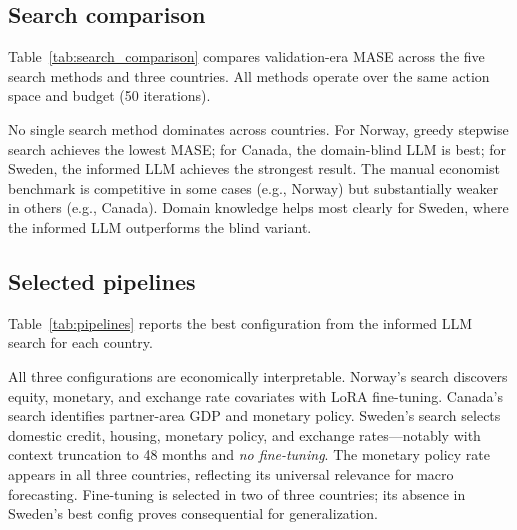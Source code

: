 \documentclass[12pt,a4paper]{article}
\begin{document}
\subsection{Search comparison}
\label{sec:results_search}

Table~\ref{tab:search_comparison} compares validation-era MASE across the five search methods and three countries. All methods operate over the same action space and budget (50 iterations).

\begin{table}[H]
\centering
\caption{Search comparison: validation-era MASE by country and method}
\label{tab:search_comparison}

\end{table}

No single search method dominates across countries. For Norway, greedy stepwise search achieves the lowest MASE; for Canada, the domain-blind LLM is best; for Sweden, the informed LLM achieves the strongest result. The manual economist benchmark is competitive in some cases (e.g., Norway) but substantially weaker in others (e.g., Canada). Domain knowledge helps most clearly for Sweden, where the informed LLM outperforms the blind variant.


\subsection{Selected pipelines}
\label{sec:results_pipelines}

Table~\ref{tab:pipelines} reports the best configuration from the informed LLM search for each country.

\begin{table}[H]
\centering
\caption{Best search configuration per country (informed LLM, seed 42)}
\label{tab:pipelines}

\end{table}

All three configurations are economically interpretable. Norway's search discovers equity, monetary, and exchange rate covariates with LoRA fine-tuning. Canada's search identifies partner-area GDP and monetary policy. Sweden's search selects domestic credit, housing, monetary policy, and exchange rates---notably with context truncation to 48 months and \emph{no fine-tuning}. The monetary policy rate appears in all three countries, reflecting its universal relevance for macro forecasting. Fine-tuning is selected in two of three countries; its absence in Sweden's best config proves consequential for generalization.
\end{document}
